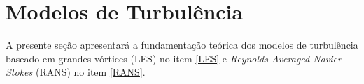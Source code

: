 \section{Modelos de Turbulência} \label{MdT}

A presente seção apresentará a fundamentação teórica dos modelos de turbulência baseado em grandes vórtices (LES) no item \ref{LES} e \textit{Reynolds-Averaged Navier-Stokes} (RANS) no item \ref{RANS}.

%


%